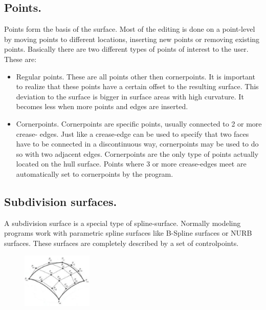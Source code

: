 \documentclass[12pt]{article}
\begin{document}
\subsection{Points.}
Points form the basis of the surface. Most of the editing is done on a point-level by moving points to
different locations, inserting new points or removing existing points. Basically there are two different
types of points of interest to the user. These are:

\begin{itemize}
  \item Regular points. These are all points other then cornerpoints. It is important to realize that
these points have a certain offset to the resulting surface. This deviation to the surface is
bigger in surface areas with high curvature. It becomes less when more points and edges
are inserted.
  \item Cornerpoints. Cornerpoints are specific points, usually connected to 2 or more crease-
edges. Just like a crease-edge can be used to specify that two faces have to be connected
in a discontinuous way, cornerpoints may be used to do so with two adjacent edges.
Cornerpoints are the only type of points actually located on the hull surface. Points where 3
or more crease-edges meet are automatically set to cornerpoints by the program.
\end{itemize}

\subsection{Subdivision surfaces.}

A subdivision surface is a special type of spline-surface. Normally
modeling programs work with parametric spline surfaces like B-Spline
surfaces or NURB surfaces. These surfaces are completely described by
a set of controlpoints.

\begin{figure}
        \centering
        \includegraphics[width=0.3\textwidth,natwidth=311,natheight=240]{figure2.png}
        \caption{}
        \label{fig:mesh1}
\end{figure}
\end{document}
